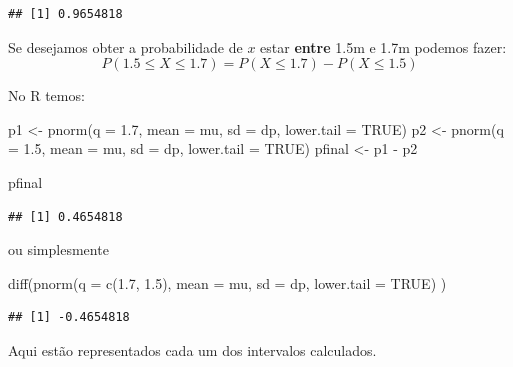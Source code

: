 \documentclass[
]{book}
\newenvironment{Shaded}{\begin{snugshade}}{\end{snugshade}}
\newcommand{\AttributeTok}[1]{\textcolor[rgb]{0.77,0.63,0.00}{#1}}
\newcommand{\ConstantTok}[1]{\textcolor[rgb]{0.00,0.00,0.00}{#1}}
\newcommand{\FloatTok}[1]{\textcolor[rgb]{0.00,0.00,0.81}{#1}}
\newcommand{\FunctionTok}[1]{\textcolor[rgb]{0.00,0.00,0.00}{#1}}
\newcommand{\NormalTok}[1]{#1}
\newcommand{\OtherTok}[1]{\textcolor[rgb]{0.56,0.35,0.01}{#1}}
\newcommand{\SpecialCharTok}[1]{\textcolor[rgb]{0.00,0.00,0.00}{#1}}
\begin{document}
\begin{verbatim}
## [1] 0.9654818
\end{verbatim}

Se desejamos obter a probabilidade de \(x\) estar \textbf{entre} 1.5m e 1.7m podemos fazer: \[P(1.5 \le X \le 1.7) = P(X \le 1.7) - P(X \le 1.5)\]

No R temos:

\begin{Shaded}
\begin{Highlighting}[]
\NormalTok{p1 }\OtherTok{\textless{}{-}} \FunctionTok{pnorm}\NormalTok{(}\AttributeTok{q =} \FloatTok{1.7}\NormalTok{, }\AttributeTok{mean =}\NormalTok{ mu, }\AttributeTok{sd =}\NormalTok{ dp, }\AttributeTok{lower.tail =} \ConstantTok{TRUE}\NormalTok{)}
\NormalTok{p2 }\OtherTok{\textless{}{-}} \FunctionTok{pnorm}\NormalTok{(}\AttributeTok{q =} \FloatTok{1.5}\NormalTok{, }\AttributeTok{mean =}\NormalTok{ mu, }\AttributeTok{sd =}\NormalTok{ dp, }\AttributeTok{lower.tail =} \ConstantTok{TRUE}\NormalTok{)}
\NormalTok{pfinal }\OtherTok{\textless{}{-}}\NormalTok{ p1 }\SpecialCharTok{{-}}\NormalTok{ p2}

\NormalTok{pfinal}
\end{Highlighting}
\end{Shaded}

\begin{verbatim}
## [1] 0.4654818
\end{verbatim}

ou simplesmente

\begin{Shaded}
\begin{Highlighting}[]
\FunctionTok{diff}\NormalTok{(}\FunctionTok{pnorm}\NormalTok{(}\AttributeTok{q =} \FunctionTok{c}\NormalTok{(}\FloatTok{1.7}\NormalTok{, }\FloatTok{1.5}\NormalTok{),}
           \AttributeTok{mean =}\NormalTok{ mu,}
           \AttributeTok{sd =}\NormalTok{ dp,}
           \AttributeTok{lower.tail =} \ConstantTok{TRUE}\NormalTok{)}
\NormalTok{     )}
\end{Highlighting}
\end{Shaded}

\begin{verbatim}
## [1] -0.4654818
\end{verbatim}

Aqui estão representados cada um dos intervalos calculados.
\end{document}
